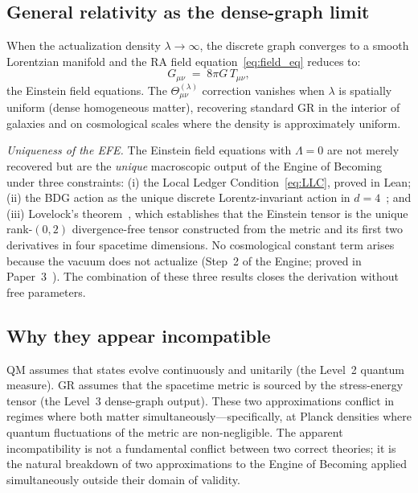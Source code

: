 \documentclass[11pt,twocolumn]{article}
\theoremstyle{plain}
\theoremstyle{remark}
\begin{document}
\subsection{General relativity as the dense-graph limit}

When the actualization density $\lambda \to \infty$, the discrete
graph converges to a smooth Lorentzian manifold and the RA field
equation~\eqref{eq:field_eq} reduces to:
\begin{equation}
  G_{\mu\nu} \;=\; 8\pi G\, T_{\mu\nu},
  \label{eq:gr_limit}
\end{equation}
the Einstein field equations.
The $\Theta_{\mu\nu}^{(\lambda)}$ correction vanishes when $\lambda$
is spatially uniform (dense homogeneous matter), recovering standard
GR in the interior of galaxies and on cosmological scales where
the density is approximately uniform.

\emph{Uniqueness of the EFE.}
The Einstein field equations with $\Lambda = 0$ are not merely
recovered but are the \emph{unique} macroscopic output of the
Engine of Becoming under three constraints: (i) the Local Ledger
Condition~\eqref{eq:LLC}, proved in Lean; (ii) the BDG action as
the unique discrete Lorentz-invariant action in $d=4$~\cite{Glaser2014};
and (iii) Lovelock's theorem~\cite{Lovelock1971}, which establishes
that the Einstein tensor is the unique rank-$(0,2)$ divergence-free
tensor constructed from the metric and its first two derivatives
in four spacetime dimensions.
No cosmological constant term arises because the vacuum does not
actualize (Step~2 of the Engine; proved in Paper~3~\cite{Sandeman2026P3}).
The combination of these three results closes the derivation without
free parameters.

\subsection{Why they appear incompatible}

QM assumes that states evolve continuously and unitarily (the
Level~2 quantum measure).
GR assumes that the spacetime metric is sourced by the stress-energy
tensor (the Level~3 dense-graph output).
These two approximations conflict in regimes where both matter
simultaneously---specifically, at Planck densities where quantum
fluctuations of the metric are non-negligible.
The apparent incompatibility is not a fundamental conflict between
two correct theories; it is the natural breakdown of two
approximations to the Engine of Becoming applied simultaneously
outside their domain of validity.
\end{document}
